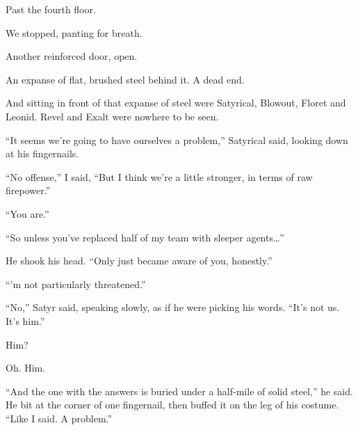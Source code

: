Past the fourth floor.



We stopped, panting for breath.



Another reinforced door, open.



An expanse of flat, brushed steel behind it.  A dead end.



And sitting in front of that expanse of steel were Satyrical, Blowout, Floret and Leonid.  Revel and Exalt were nowhere to be seen.



``It seems we're going to have ourselves a problem,'' Satyrical said, looking down at his fingernails.



``No offense,'' I said, ``But I think we're a little stronger, in terms of raw firepower.''



``You are.''



``So unless you've replaced half of my team with sleeper agents\ldots''



He shook his head.  ``Only just became aware of you, honestly.''



``\ldotsI'm not particularly threatened.''



``No,'' Satyr said, speaking slowly, as if he were picking his words.  ``It's not us.  It's him.''



Him?



Oh.  Him.



``And the one with the answers is buried under a half-mile of solid steel,'' he said.  He bit at the corner of one fingernail, then buffed it on the leg of his costume.  ``Like I said.  A problem.''





